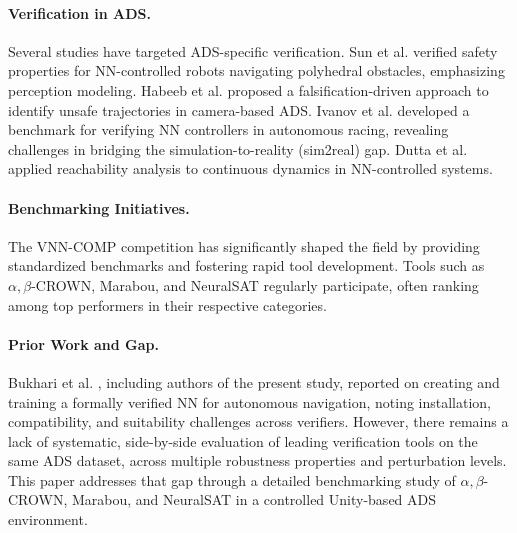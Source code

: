 \paragraph{Verification in ADS.} Several studies have targeted ADS-specific verification. Sun et al. \cite{sun2019formal} verified safety properties for NN-controlled robots navigating polyhedral obstacles, emphasizing perception modeling. Habeeb et al. \cite{habeeb2023verification} proposed a falsification-driven approach to identify unsafe trajectories in camera-based ADS. Ivanov et al. \cite{ivanov2020case} developed a benchmark for verifying NN controllers in autonomous racing, revealing challenges in bridging the simulation-to-reality (sim2real) gap. Dutta et al. \cite{dutta2019reachability} applied reachability analysis to continuous dynamics in NN-controlled systems.

\paragraph{Benchmarking Initiatives.} The VNN-COMP competition \cite{bak2021second, brix2023fourth} has significantly shaped the field by providing standardized benchmarks and fostering rapid tool development. Tools such as \(\alpha,\beta\)-CROWN, Marabou, and NeuralSAT regularly participate, often ranking among top performers in their respective categories.

\paragraph{Prior Work and Gap.} Bukhari et al. \cite{bukhari2024creating}, including authors of the present study, reported on creating and training a formally verified NN for autonomous navigation, noting installation, compatibility, and suitability challenges across verifiers. However, there remains a lack of systematic, side-by-side evaluation of leading verification tools on the same ADS dataset, across multiple robustness properties and perturbation levels. This paper addresses that gap through a detailed benchmarking study of \(\alpha,\beta\)-CROWN, Marabou, and NeuralSAT in a controlled Unity-based ADS environment.
